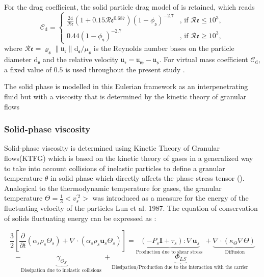 \documentclass[11pt]{report}
\begin{document}
%
For the drag coefficient, the solid particle drag model of \citet{wen1966generalized} is retained, which reads
\begin{equation}
\mathcal{C}_{\mathrm{d}}=
\begin{cases}
\frac{24}{\mathcal{R}\mathfrak{e}}\left(1+0.15\mathcal{R}\mathfrak{e}^{0.687}\right)\left(1-\phi_{\mathfrak{s}}\right)^{-2.7}&\text{, if } \mathcal{R}\mathfrak{e}\le 10^3,\\
0.44\left(1-\phi_{\mathfrak{s}}\right)^{-2.7} &\text{, if } \mathcal{R}\mathfrak{e}\ge 10^3,
\end{cases}
\end{equation}
where $\mathcal{R}\mathfrak{e}=\varrho_{\mathfrak{s}}\|\mathfrak{u}_{\mathfrak{r}}\|\mathrm{d}_{\mathfrak{s}}/\mu_{\mathfrak{s}}$ is the Reynolds number bases on the particle diameter $\mathrm{d}_{\mathfrak{s}}$ and the relative velocity $\boldsymbol{\mathfrak{u}}_{\mathfrak{r}}=\boldsymbol{\mathfrak{u}}_{\mathfrak{w}}-\boldsymbol{\mathfrak{u}}_{\mathfrak{s}}$. For virtual mass coefficient 
$\mathcal{C}_{\mathrm{d}}$, a fixed value of $0.5$ is used throughout the present study \cite{auton1988force}.


The solid phase is modelled in this Eulerian framework as an interpenetrating fluid but with a viscosity that is determined by the kinetic theory of granular flows 
\subsubsection{Solid-phase viscosity}
Solid-phase viscosity is determined using Kinetic Theory of Granular flows(KTFG) which is based on the kinetic theory of gases in a generalized way to take into account collisions of inelastic particles to define a granular temperature $\theta$ in solid phase which directly affects the phase stress tensor (\cite{Gonzalez-2017}). Analogical to the thermodynamic temperature for gases, the granular temperature $\Theta=\frac{1}{3}<v_{s}^{\prime 2}>$ was introduced as a measure for the energy of the fluctuating velocity of the particles  Lun et al. 1987.
The equation of conservation of solids fluctuating energy can be expressed as \cite{Wang-2013}: 

\begin{equation}
\frac{3}{2}\left[\frac{\partial}{\partial t}\left(\alpha_{s} \rho_{s} \Theta_{s}\right)+\nabla \cdot\left(\alpha_{s} \rho_{s} \mathbf{u}_{s} \Theta_{s}\right)\right]= 
\underbrace{\left(-P_{s} \mathbf{I}+\tau_{s}\right): \nabla \mathbf{u}_{s}}_{\text {Production due to shear stress }}+\underbrace{\nabla \cdot\left(\kappa_{\Theta} \nabla \Theta\right)}_{\text { Diffusion}}
\end{equation}
$$
-\underbrace{\gamma_{\Theta_S}}_{\text {Dissipation due  to  inelastic collisions }}+\underbrace{\Phi_{LS}}_{\text {Dissipation/Production  due to the interaction with the carrier }}
$$
\end{document}

